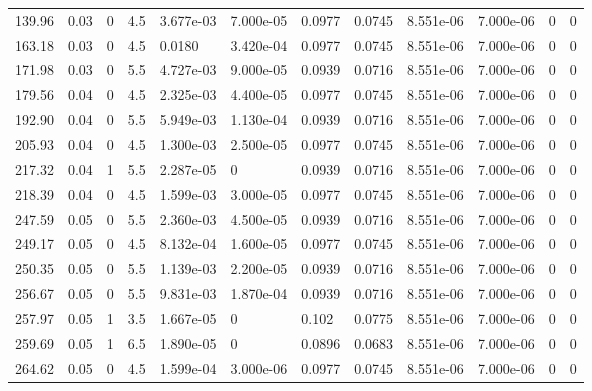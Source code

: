 \documentclass[preview]{standalone}
\begin{document}
{{\begin{tabular}{L{1.2cm}C{1.2cm} C{0.3cm}C{0.5cm} C{1.4cm}C{1.4cm} C{1.4cm}C{1.4cm} C{1.6cm}C{1.6cm} C{1.6cm}C{1.6cm}}
  139.96  &  0.03  & 0     & 4.5 &  3.677e-03  & 7.000e-05  &  0.0977&   0.0745& 8.551e-06 & 7.000e-06   &  0 & 0  \\ 
  163.18  &  0.03  & 0     & 4.5 &  0.0180  & 3.420e-04  &  0.0977&   0.0745& 8.551e-06 & 7.000e-06   &  0 & 0  \\ 
  171.98  &  0.03  & 0     & 5.5 &  4.727e-03  & 9.000e-05  &  0.0939&   0.0716& 8.551e-06 & 7.000e-06   &  0 & 0  \\ 
  179.56  &  0.04  & 0     & 4.5 &  2.325e-03  & 4.400e-05  &  0.0977&   0.0745& 8.551e-06 & 7.000e-06   &  0 & 0  \\ 
  192.90  &  0.04  & 0     & 5.5 &  5.949e-03  & 1.130e-04  &  0.0939&   0.0716& 8.551e-06 & 7.000e-06   &  0 & 0  \\ 
  205.93  &  0.04  & 0     & 4.5 &  1.300e-03  & 2.500e-05  &  0.0977&   0.0745& 8.551e-06 & 7.000e-06   &  0 & 0  \\ 
  217.32  &  0.04  & 1     & 5.5 &  2.287e-05  & 0  &  0.0939&   0.0716& 8.551e-06 & 7.000e-06   &  0 & 0  \\ 
  218.39  &  0.04  & 0     & 4.5 &  1.599e-03  & 3.000e-05  &  0.0977&   0.0745& 8.551e-06 & 7.000e-06   &  0 & 0  \\ 
  247.59  &  0.05  & 0     & 5.5 &  2.360e-03  & 4.500e-05  &  0.0939&   0.0716& 8.551e-06 & 7.000e-06   &  0 & 0  \\ 
  249.17  &  0.05  & 0     & 4.5 &  8.132e-04  & 1.600e-05  &  0.0977&   0.0745& 8.551e-06 & 7.000e-06   &  0 & 0  \\ 
  250.35  &  0.05  & 0     & 5.5 &  1.139e-03  & 2.200e-05  &  0.0939&   0.0716& 8.551e-06 & 7.000e-06   &  0 & 0  \\ 
  256.67  &  0.05  & 0     & 5.5 &  9.831e-03  & 1.870e-04  &  0.0939&   0.0716& 8.551e-06 & 7.000e-06   &  0 & 0  \\ 
  257.97  &  0.05  & 1     & 3.5 &  1.667e-05  & 0  &  0.102&   0.0775& 8.551e-06 & 7.000e-06   &  0 & 0  \\ 
  259.69  &  0.05  & 1     & 6.5 &  1.890e-05  & 0  &  0.0896&   0.0683& 8.551e-06 & 7.000e-06   &  0 & 0  \\ 
  264.62  &  0.05  & 0     & 4.5 &  1.599e-04  & 3.000e-06  &  0.0977&   0.0745& 8.551e-06 & 7.000e-06   &  0 & 0  \\ 
\hline 
\end{tabular} 

}}
\end{document}
